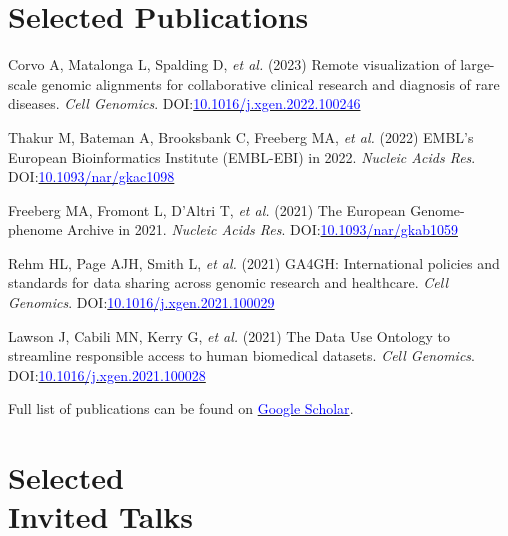 \documentclass[margin,line]{res}
\begin{document}
\begin{resume}
\section{\sc Selected Publications}

Corvo A, Matalonga L, Spalding D, {\em et al.} (2023) Remote visualization of large-scale genomic alignments for collaborative clinical research and diagnosis of rare diseases. {\em Cell Genomics}. DOI:\href{https://doi.org/10.1016/j.xgen.2022.100246}{\textcolor{blue}{10.1016/j.xgen.2022.100246}}

Thakur M, Bateman A, Brooksbank C, Freeberg MA, {\em et al.} (2022) EMBL's European Bioinformatics Institute (EMBL-EBI) in 2022. {\em Nucleic Acids Res}. DOI:\href{https://doi.org/10.1093/nar/gkac1098}{\textcolor{blue}{10.1093/nar/gkac1098}}

Freeberg MA, Fromont L, D'Altri T, {\em et al.} (2021) The European Genome-phenome Archive in 2021. {\em Nucleic Acids Res}. DOI:\href{https://doi.org/10.1093/nar/gkab1059}{\textcolor{blue}{10.1093/nar/gkab1059}}

Rehm HL, Page AJH, Smith L, {\em et al.} (2021) GA4GH: International policies and standards for data sharing across genomic research and healthcare. {\em Cell Genomics}. DOI:\href{https://doi.org/10.1016/j.xgen.2021.100029}{\textcolor{blue}{10.1016/j.xgen.2021.100029}}

Lawson J, Cabili MN, Kerry G, {\em et al.} (2021) The Data Use Ontology to streamline responsible access to human biomedical datasets. {\em Cell Genomics}. DOI:\href{https://doi.org/10.1016/j.xgen.2021.100028}{\textcolor{blue}{10.1016/j.xgen.2021.100028}}


\Rightarrow  Full list of publications can be found on \href{https://scholar.google.com/citations?user=2LCcJA0AAAAJ&hl=en}{\textcolor{blue}{Google Scholar}}.

\section{\sc Selected\\ Invited Talks}


\end{resume}
\end{document}
